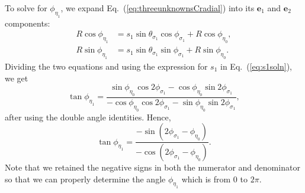 \documentclass[a4paper,twocolumn,superscriptaddress]{revtex4-1}
\begin{document}
{To solve for $\phi_{ \eta_1 }$, we expand Eq.~(\ref{eq:threeunknownsCradial}) into its $\mathbf e_1$ and $\mathbf e_2$ components:
\begin{subequations}
  \label{eq:threeunknownsCradialcomponents}
    \begin{align}
    \label{eq:threeunknownsCradialcomponents1}
    R \cos \phi_{ \eta_1 } &= s_1 \sin \theta_{ \sigma_1 } \cos \phi_{ \sigma_1 } + R \cos \phi_{ \eta_0 } ,
    \\
    \label{eq:threeunknownsCradialcomponents2}
    R \sin \phi_{ \eta_1 } &= s_1 \sin \theta_{ \sigma_1 } \sin \phi_{ \sigma_1 } + R \sin \phi_{ \eta_0 } .
  \end{align}
\end{subequations}
Dividing the two equations and using the expression for $s_1$ in Eq.~(\ref{eq:s1soln}), we get
\begin{equation}
  \label{eq:thanphieta2short}
\tan \phi_{ \eta_1 }
= \dfrac{ \sin \phi_{ \eta_0 }\cos 2\phi_{ \sigma_1 } - \cos \phi_{ \eta_0 } \sin 2\phi_{ \sigma_1 } }
{- \cos \phi_{ \eta_0 } \cos 2\phi_{ \sigma_1 }  - \sin \phi_{ \eta_0 } \sin 2\phi_{ \sigma_1 } }  ,
\end{equation}
after using the double angle identities.
Hence, 
\begin{equation}
\label{eq:phieta2}
\tan \phi_{ \eta_1 } = 
\dfrac{- \sin ( 2\phi_{ \sigma_1 } - \phi_{ \eta_0 }) }{ - \cos ( 2\phi_{ \sigma_1 } - \phi_{ \eta_0 })} .
\end{equation}
Note that we retained the negative signs in both the numerator and denominator so that we can properly determine the angle $\phi_{ \eta_1 }$ which is from $0$ to $2\pi$.


}
\end{document}

